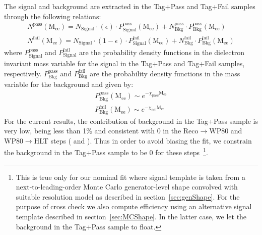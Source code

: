 The signal and background are extracted in the Tag+Pass and Tag+Fail samples through the following relations:
\begin{eqnarray}
  N^{\mathrm{pass}}\mathrm{(M_{ee})} = N_{\mathrm{Signal}} \cdot (\epsilon) \cdot P^{\mathrm{pass}}_{\mathrm{Signal}}\mathrm{(M_{ee})} +  N^{\mathrm{pass}}_{\mathrm{Bkg}} \cdot P^{\mathrm{pass}}_{\mathrm{Bkg}}\mathrm{(M_{ee})} \\
  N^{\mathrm{fail}}\mathrm{(M_{ee})} = N_{\mathrm{Signal}} \cdot (1 - \epsilon) \cdot P^{\mathrm{fail}}_{\mathrm{Signal}}\mathrm{(M_{ee})} +  N^{\mathrm{fail}}_{\mathrm{Bkg}} \cdot P^{\mathrm{fail}}_{\mathrm{Bkg}}\mathrm{(M_{ee})}
\end{eqnarray}
where $P^{\mathrm{pass}}_{\mathrm{Signal}}$ and $P^{\mathrm{fail}}_{\mathrm{Signal}}$ are the probability density functions in the dielectron invariant mass variable for the signal in the Tag+Pass and Tag+Fail samples, respectively. $P^{\mathrm{pass}}_{\mathrm{Bkg}}$ and $P^{\mathrm{fail}}_{\mathrm{Bkg}}$ are the probability density functions in the mass variable for the background and given by:
\begin{eqnarray}
  P^{\mathrm{pass}}_{\mathrm{Bkg}}\mathrm{(M_{ee})} \sim e^{-\chi_{\mathrm{pass}}\mathrm{M_{ee}}} \\
  P^{\mathrm{fail}}_{\mathrm{Bkg}}\mathrm{(M_{ee})} \sim e^{-\chi_{\mathrm{fail}}\mathrm{M_{ee}}} 
\end{eqnarray}
For the current results, the contribution of background in the Tag+Pass sample is very low, being less than 1\% and consistent 
with 0 in the Reco$\to$WP80 and WP80$\to$HLT steps (\cite{CMSAN2010/277} and \cite{CMSAN2010/284}). 
Thus in order to avoid biasing the fit, we constrain the background in the 
Tag+Pass sample to be 0 for these steps~\footnote{This is true only for our 
nominal fit where signal template  is taken from a next-to-leading-order Monte Carlo 
generator-level shape convolved with suitable resolution model as described in 
section~\ref{sec:genShape}. For the purpose of cross check we also compute efficiency 
using an alternative signal template described in section~\ref{sec:MCShape}. 
In the latter case, we let the background in the Tag+Pass sample to float.}. 

